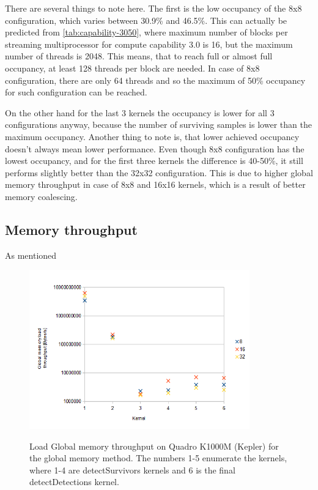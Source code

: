 There are several things to note here. The first is the low occupancy of the 8x8 configuration, which varies between 30.9\% and 46.5\%. This can actually be predicted from \ref{tab:capability-3050}, where maximum number of blocks per streaming multiprocessor for compute capability 3.0 is 16, but the maximum number of threads is 2048. This means, that to reach full or almost full occupancy, at least 128 threads per block are needed. In case of 8x8 configuration, there are only 64 threads and so the maximum of 50\% occupancy for such configuration can be reached.

On the other hand for the last 3 kernels the occupancy is lower for all 3 configurations anyway, because the number of surviving samples is lower than the maximum occupancy. Another thing to note is, that lower achieved occupancy doesn't always mean lower performance. Even though 8x8 configuration has the lowest occupancy, and for the first three kernels the difference is 40-50\%, it still performs slightly better than the 32x32 configuration. This is due to higher global memory throughput in case of 8x8 and 16x16 kernels, which is a result of better memory coalescing.

\subsection{Memory throughput}

As mentioned 

\begin{center}
\begin{figure}[h]
	\centering\includegraphics[width=0.85\textwidth]{fig/load_gthroughput_quadro.png}\label{fig:load-g-throughput}
	\caption{Load Global memory throughput on Quadro K1000M (Kepler) for the global memory method. The numbers 1-5 enumerate the kernels, where 1-4 are detectSurvivors kernels and 6 is the final detectDetections kernel.}
\end{figure}
\end{center}

